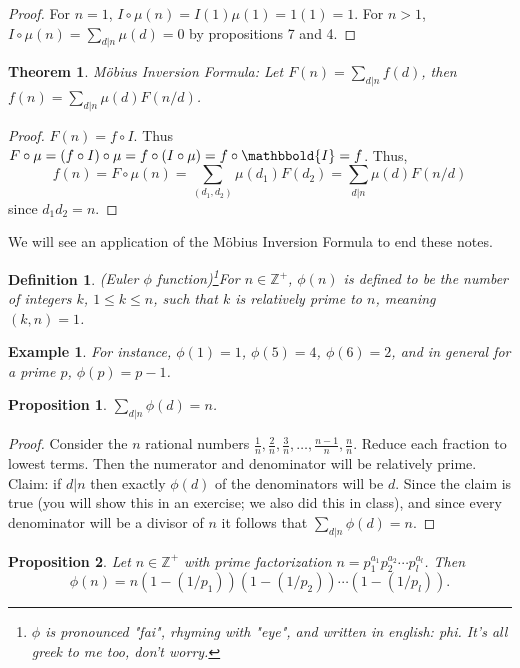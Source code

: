 \documentclass{article}
\theoremstyle{problemstyle}
\newtheorem{theorem}{Theorem}
\newtheorem{example}{Example}
\newtheorem{proposition}{Proposition}
\newtheorem{definition}{Definition}
\begin{document}
\begin{proof}
For $n = 1$, $I \circ \mu(n) = I(1)\mu(1) = 1(1) = 1$. For $n > 1$, $I \circ \mu(n) = \sum_{d|n}\mu(d) = 0$ by propositions 7 and 4.  
\end{proof}

\begin{theorem}
M\"obius Inversion Formula: Let $F(n) = \sum_{d|n}f(d)$, then $f(n) = \sum_{d|n}\mu(d)F(n/d)$.
\end{theorem}

\begin{proof}
$F(n) = f \circ I$. Thus $F \circ \mu = (f \circ I) \circ \mu = f \circ (I \circ \mu) = f \circ \mathbbold{I} = f$. Thus, $$f(n) = F \circ \mu(n) = \sum_{(d_1,d_2)}\mu(d_1)F(d_2) = \sum_{d|n}\mu(d)F(n/d)$$ since $d_1d_2 = n$. 
\end{proof}

We will see an application of the M\"obius Inversion Formula to end these notes. 

\begin{definition}
(Euler $\phi$ function)\footnote{$\phi$ is pronounced "fai", rhyming with "eye", and written in english: phi. It's all greek to me too, don't worry.}For $n \in \mathbb{Z}^+$, $\phi(n)$ is defined to be the number of integers $k$, $1 \leq k \leq n$, such that $k$ is relatively prime to $n$, meaning $(k,n) = 1$. 
\end{definition}

\begin{example}
For instance, $\phi(1) = 1$, $\phi(5) = 4$, $\phi(6) = 2$, and in general for a prime $p$, $\phi(p) = p-1$. 
\end{example}

\begin{proposition}
$\sum_{d|n}\phi(d) = n$.
\end{proposition}

\begin{proof}
Consider the $n$ rational numbers $\frac{1}{n},\frac{2}{n},\frac{3}{n},\ldots,\frac{n-1}{n},\frac{n}{n}$. Reduce each fraction to lowest terms. Then the numerator and denominator will be relatively prime. Claim: if $d|n$ then exactly $\phi(d)$ of the denominators will be $d$. Since the claim is true (you will show this in an exercise; we also did this in class), and since every denominator will be a divisor of $n$ it follows that $\sum_{d|n}\phi(d) = n$. 
\end{proof}

\begin{proposition}
Let $n \in \mathbb{Z}^+$ with prime factorization $n = p_1^{a_1}p_2^{a_2}\cdots p_l^{a_l}$. Then $$\phi(n) = n(1-(1/p_1))(1-(1/p_2))\cdots(1-(1/p_l)).$$
\end{proposition}
\end{document}
